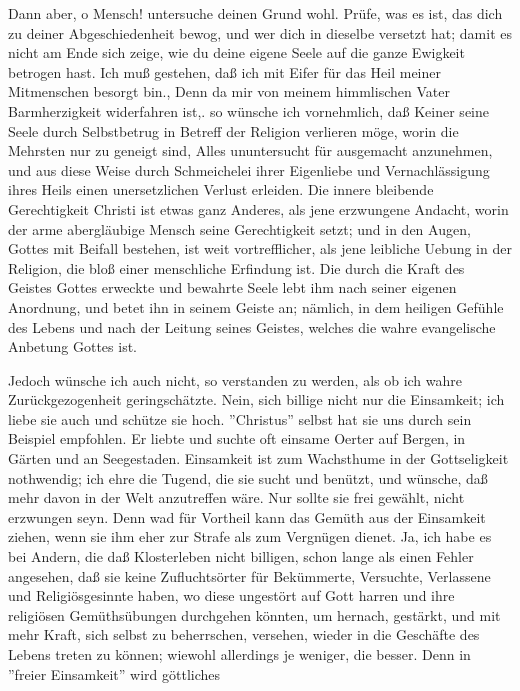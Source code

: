 Dann aber, o Mensch! untersuche deinen Grund wohl. Prüfe, was es ist, das dich zu deiner Abgeschiedenheit bewog, und wer dich in dieselbe versetzt hat; damit es nicht am Ende sich zeige, wie du deine eigene Seele auf die ganze Ewigkeit betrogen hast. Ich muß gestehen, daß ich mit Eifer für das Heil meiner Mitmenschen besorgt bin., Denn da mir von meinem himmlischen Vater Barmherzigkeit widerfahren ist,. so wünsche ich vornehmlich, daß Keiner seine Seele durch Selbstbetrug in Betreff der Religion verlieren möge, worin die Mehrsten nur zu geneigt sind, Alles ununtersucht für ausgemacht anzunehmen, und aus diese Weise durch Schmeichelei ihrer Eigenliebe und Vernachlässigung ihres Heils einen unersetzlichen Verlust erleiden. Die innere bleibende Gerechtigkeit Christi ist etwas ganz Anderes, als jene erzwungene Andacht, worin der arme abergläubige Mensch seine Gerechtigkeit setzt; und in den Augen, Gottes mit Beifall bestehen, ist weit vortrefflicher, als jene leibliche Uebung in der Religion, die bloß einer menschliche Erfindung ist. Die durch die Kraft des Geistes Gottes erweckte und bewahrte Seele lebt ihm nach seiner eigenen Anordnung, und betet ihn in seinem Geiste an; nämlich, in dem heiligen Gefühle des Lebens und nach der Leitung seines Geistes, welches die wahre evangelische Anbetung Gottes ist.

Jedoch wünsche ich auch nicht, so verstanden zu werden, als ob ich wahre Zurückgezogenheit geringschätzte. Nein, sich billige nicht nur die Einsamkeit; ich liebe sie auch und schütze sie hoch. ''Christus'' selbst hat sie uns durch sein Beispiel empfohlen. Er liebte und suchte oft einsame Oerter auf Bergen, in Gärten und an Seegestaden. Einsamkeit ist zum Wachsthume in der Gottseligkeit nothwendig; ich ehre die Tugend, die sie sucht und benützt, und wünsche, daß mehr davon in der Welt anzutreffen wäre. Nur sollte sie frei gewählt, nicht erzwungen seyn. Denn wad für Vortheil kann das Gemüth aus der Einsamkeit ziehen, wenn sie ihm eher zur Strafe als zum Vergnügen dienet. Ja, ich habe es bei Andern, die daß Klosterleben nicht billigen, schon lange als einen Fehler angesehen, daß sie keine Zufluchtsörter für Bekümmerte, Versuchte, Verlassene und Religiösgesinnte haben, wo diese ungestört auf Gott harren und ihre religiösen Gemüthsübungen durchgehen könnten, um hernach, gestärkt, und mit mehr Kraft, sich selbst zu beherrschen, versehen, wieder in die Geschäfte des Lebens treten zu können; wiewohl allerdings je weniger, die besser. Denn in ''freier Einsamkeit'' wird göttliches 



